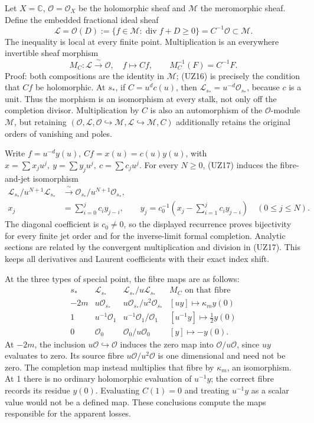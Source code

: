 \documentclass[
  10pt,
  a4paper,
]{article}
\begin{document}
Let \(X=\mathbb C\), \(\mathcal O=\mathcal O_X\) be the holomorphic
sheaf and \(\mathcal M\) the meromorphic sheaf. Define the embedded
fractional ideal sheaf \[
\mathcal L=\mathcal O(D)
:=\{f\in\mathcal M:\operatorname{div}f+D\ge0\}
=C^{-1}\mathcal O\subset\mathcal M.
\tag{UZ16}
\] The inequality is local at every finite point. Multiplication is an
everywhere invertible sheaf morphism \[
M_C:\mathcal L\xrightarrow{\;\sim\;}\mathcal O,\quad f\mapsto Cf,
\qquad M_C^{-1}(F)=C^{-1}F .
\tag{UZ17}
\] Proof: both compositions are the identity in \(\mathcal M\); (UZ16)
is precisely the condition that \(Cf\) be holomorphic. At \(s_*\), if
\(C=u^dc(u)\), then \(\mathcal L_{s_*}=u^{-d}\mathcal O_{s_*}\), because
\(c\) is a unit. Thus the morphism is an isomorphism at every stalk, not
only off the completion divisor. Multiplication by \(C\) is also an
automorphism of the \(\mathcal O\)-module \(\mathcal M\), but retaining
\((\mathcal O,\mathcal L,\mathcal O\hookrightarrow\mathcal M,\mathcal L\hookrightarrow\mathcal M,C)\)
additionally retains the original orders of vanishing and poles.

Write \(f=u^{-d}y(u)\), \(Cf=x(u)=c(u)y(u)\), with
\(x=\sum x_j u^j,\ y=\sum y_j u^j,\ c=\sum c_j u^j\). For every
\(N\ge0\), (UZ17) induces the fibre-and-jet isomorphism \[
\begin{aligned}
\mathcal L_{s_*}/u^{N+1}\mathcal L_{s_*}
&\xrightarrow{\;\sim\;}
\mathcal O_{s_*}/u^{N+1}\mathcal O_{s_*},\\
x_j&=\sum_{i=0}^{j}c_i y_{j-i},\qquad
y_j=c_0^{-1}\left(x_j-\sum_{i=1}^{j}c_i y_{j-i}\right)
\quad(0\le j\le N).
\end{aligned}\tag{UZ18}
\] The diagonal coefficient is \(c_0\ne0\), so the displayed recurrence
proves bijectivity for every finite jet order and for the inverse-limit
formal completion. Analytic sections are related by the convergent
multiplication and division in (UZ17). This keeps all derivatives and
Laurent coefficients with their exact index shift.

At the three types of special point, the fibre maps are as follows: \[
\begin{array}{c|c|c|c}
s_* & \mathcal L_{s_*} & \mathcal L_{s_*}/u\mathcal L_{s_*}
& M_C\text{ on that fibre}\\ \hline
-2m & u\mathcal O_{s_*} & u\mathcal O_{s_*}/u^2\mathcal O_{s_*}
& [u y]\mapsto \kappa_m y(0)\\
1 & u^{-1}\mathcal O_1 & u^{-1}\mathcal O_1/\mathcal O_1
& [u^{-1}y]\mapsto \tfrac12 y(0)\\
0 & \mathcal O_0 & \mathcal O_0/u\mathcal O_0
& [y]\mapsto -y(0).
\end{array}\tag{UZ19}
\] At \(-2m\), the inclusion \(u\mathcal O\hookrightarrow\mathcal O\)
induces the zero map into \(\mathcal O/u\mathcal O\), since \(uy\)
evaluates to zero. Its source fibre \(u\mathcal O/u^2\mathcal O\) is one
dimensional and need not be zero. The completion map instead multiplies
that fibre by \(\kappa_m\), an isomorphism. At 1 there is no ordinary
holomorphic evaluation of \(u^{-1}y\); the correct fibre records its
residue \(y(0)\). Evaluating \(C(1)=0\) and treating \(u^{-1}y\) as a
scalar value would not be a defined map. These conclusions compute the
maps responsible for the apparent losses.
\end{document}
